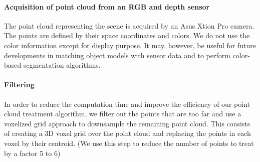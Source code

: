 \paragraph{Acquisition of point cloud from an RGB and depth sensor}
The point cloud representing the scene is acquired by an Asus Xtion Pro camera.
The points are defined by their space coordinates and colors.
We do not use the color information except for display purpose.
It may, however, be useful for future developments in matching object models with sensor data and to perform color-based segmentation algorithms.

\paragraph{Filtering}
In order to reduce the computation time and improve the efficiency of our point cloud treatment algorithm, we filter out the points that are too far and use a voxelized grid approach to downsample the remaining point cloud.
This consists of creating a 3D voxel grid over the point cloud and replacing the points in each voxel by their centroid.
(We use this step to reduce the number of points to treat by a factor 5 to 6)



